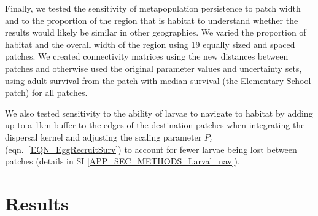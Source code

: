 \documentclass[12pt, oneside]{article}   	%
\begin{document}
Finally, we tested the sensitivity of metapopulation persistence to patch width and to the proportion of the region that is habitat to understand whether the results would likely be similar in other geographies. We varied the proportion of habitat and the overall width of the region using 19 equally sized and spaced patches. We created connectivity matrices using the new distances between patches and otherwise used the original parameter values and uncertainty sets, using adult survival from the patch with median survival (the Elementary School patch) for all patches.

We also tested sensitivity to the ability of larvae to navigate to habitat by adding up to a 1km buffer to the edges of the destination patches when integrating the dispersal kernel and adjusting the scaling parameter $P_s$ (eqn.\ \ref{EQN_EggRecruitSurv}) to account for fewer larvae being lost between patches (details in SI \ref{APP_SEC_METHODS_Larval_nav}).

\section*{Results} %


\end{document}
